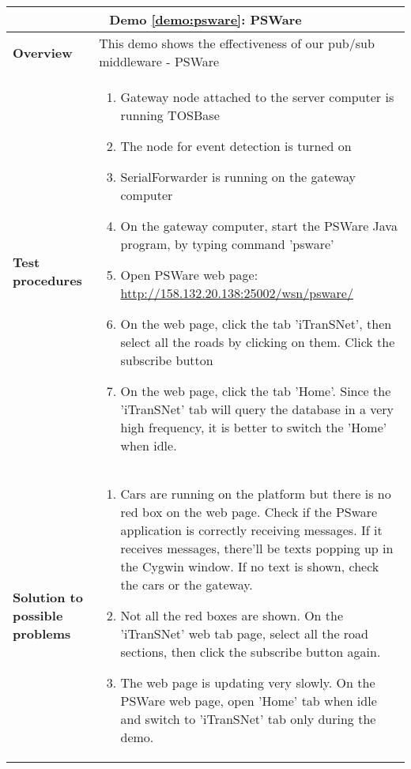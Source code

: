 \begin{center}
	\begin{tabular}{ | p{2cm} | p{10cm} | }
		\hline
		\multicolumn{2}{|c|}{\textbf{Demo \ref{demo:psware}: PSWare}} \\ \hline
		\textbf{Overview} &  This demo shows the effectiveness of our pub/sub middleware - PSWare \\ \hline
		\textbf{Test procedures} &
		\begin{enumerate}
		\item Gateway node attached to the server computer is running TOSBase
		\item The node for event detection is turned on
		\item SerialForwarder is running on the gateway computer
		\item On the gateway computer, start the PSWare Java program, by typing command 'psware'
		\item Open PSWare web page: \url{http://158.132.20.138:25002/wsn/psware/}
		\item On the web page, click the tab 'iTranSNet', then select all the roads by clicking on them. Click the subscribe button
		\item On the web page, click the tab 'Home'. Since the 'iTranSNet' tab will query the database in a very high frequency, it is better to switch the 'Home' when idle.
		\end{enumerate} \\ \hline
		\textbf{Solution to possible problems} &
		\begin{enumerate}
		\item Cars are running on the platform but there is no red box on the web page. Check if the PSware application is correctly receiving messages. If it receives messages, there'll be texts popping up in the Cygwin window. If no text is shown, check the cars or the gateway. 
		\item Not all the red boxes are shown. On the 'iTranSNet' web tab page, select all the road sections, then click the subscribe button again.
		\item The web page is updating very slowly. On the PSWare web page, open 'Home' tab when idle and switch to 'iTranSNet' tab only during the demo.
		\end{enumerate}  \\
		\hline
	\end{tabular}
\end{center}
